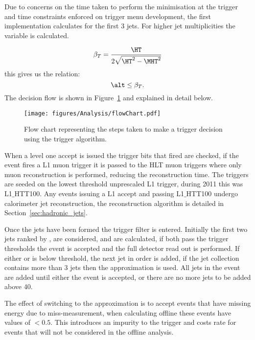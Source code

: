 Due to concerns on the time taken to perform the \dHT minimisation at the 
trigger and time constraints enforced on trigger menu development, the first 
implementation calculates \alt for the first 3 jets. For higher jet 
multiplicities the variable \bt is calculated.

\begin{equation}
  \beta_{T} = \frac{\HT}{2\sqrt{\HT^{2} - \MHT^{2}}}
  \label{eqn:betaT}
\end{equation}
this gives us the relation:
\begin{equation}
  \alt \leq \beta_{T}.
\end{equation}
The decision flow is shown in Figure~\ref{fig:figures_Analysis_flowChart} and 
explained in detail below.

\begin{figure}[ht|]
  \centering
    \texttt{[image: figures/Analysis/flowChart.pdf]}
  \caption{Flow chart representing the steps taken to make a trigger decision 
  using the \alt trigger algorithm.}
  \label{fig:figures_Analysis_flowChart}
\end{figure}


When a level one accept is issued the trigger bits that fired are checked, if 
the event fires a L1 muon trigger it is passed to the HLT muon triggers where 
only muon reconstruction is performed, reducing the reconstruction time. The 
\alt triggers are seeded on the lowest threshold unprescaled L1 \HT trigger, 
during 2011 this was L1$\_$HTT100. Any events issuing a L1 accept and passing 
L1$\_$HTT100 undergo calorimeter jet reconstruction, the reconstruction 
algorithm is detailed in Section~\ref{sec:hadronic_jets}.

Once the jets have been formed the trigger filter is entered. Initially the 
first two jets ranked by \ET, are considered, \HT and \alt are calculated, if 
both pass the trigger thresholds the event is accepted and the full detector 
read out is performed. If either \HT or \alt is below threshold, the next jet 
in \ET order is added, if the jet collection contains more than 3 jets then the 
\bt approximation is used. All jets in the event are added until either the 
event is accepted, or there are no more jets to be added above \unit{40}{\GeV}.

The effect of switching to the \bt approximation is to accept events that have 
missing energy due to miss-measurement, when calculating \alt offline these 
events have values of \alt $< 0.5$. This introduces an impurity to the trigger 
and costs rate for events that will not be considered in the offline analysis.

